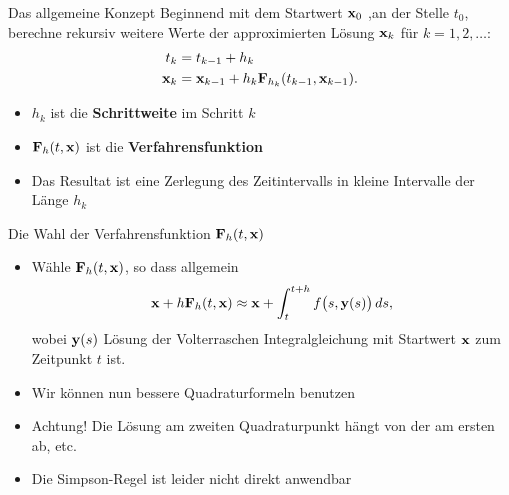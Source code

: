 \begin{frame}{Das allgemeine Konzept}
  Beginnend mit dem Startwert $\mathbf{x}_0$ ,an der Stelle $t_0$,
  berechne rekursiv weitere Werte der approximierten Lösung $\mathbf{x}_k$ für $k=1,2,\ldots$:
  \begin{align*}
    t_k &= t_{k-1} + h_k\\
    \mathbf{x}_k &= \mathbf{x}_{k-1} + h_k \mathbf{F}_{h_k}(t_{k-1},\mathbf{x}_{k-1}).
  \end{align*}
  \begin{itemize}
  \item $h_k$ ist die \textbf{Schrittweite} im Schritt $k$
  \item $\mathbf{F}_{h}(t,\mathbf{x})$ ist die \textbf{Verfahrensfunktion}
  \item Das Resultat ist eine Zerlegung des Zeitintervalls in kleine
    Intervalle der Länge $h_k$
  \end{itemize}
\end{frame}

\begin{frame}{Die Wahl der Verfahrensfunktion $\mathbf{F}_h(t,\mathbf{x})$}
  \begin{itemize}
  \item Wähle $\mathbf{F}_{h}(t,\mathbf{x})$, so dass allgemein
    \begin{gather*}
      \mathbf{x} + h \mathbf{F}_{h}(t,\mathbf{x})
      \approx \mathbf{x} + \int_t^{t+h} f\bigl(s,\mathbf{y}(s)\bigr)\,ds,
    \end{gather*}
    wobei $\mathbf{y}(s)$ Lösung der Volterraschen Integralgleichung mit
    Startwert $\mathbf{x}$ zum Zeitpunkt $t$ ist.
  \item Wir können nun bessere Quadraturformeln benutzen
    \pause
  \item Achtung! Die Lösung am zweiten Quadraturpunkt hängt von der am
    ersten ab, etc.
  \item Die Simpson-Regel ist leider nicht direkt anwendbar
  \end{itemize}
\end{frame}

